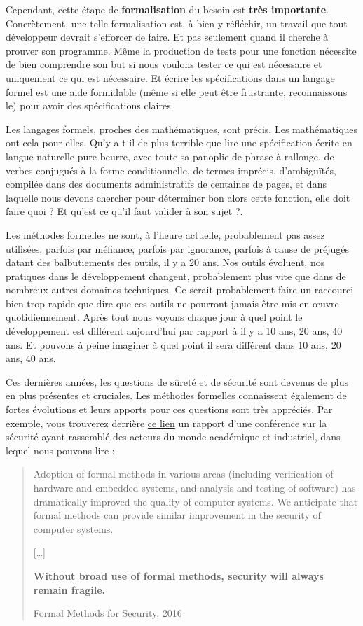 \documentclass[12pt,francais,]{scrbook}
\begin{document}
Cependant, cette étape de \textbf{formalisation} du besoin est
\textbf{très importante}. Concrètement, une telle formalisation est, à
bien y réfléchir, un travail que tout développeur devrait s'efforcer de
faire. Et pas seulement quand il cherche à prouver son programme. Même
la production de tests pour une fonction nécessite de bien comprendre
son but si nous voulons tester ce qui est nécessaire et uniquement ce
qui est nécessaire. Et écrire les spécifications dans un langage formel
est une aide formidable (même si elle peut être frustrante,
reconnaissons le) pour avoir des spécifications claires.

Les langages formels, proches des mathématiques, sont précis. Les
mathématiques ont cela pour elles. Qu'y a-t-il de plus terrible que lire
une spécification écrite en langue naturelle pure beurre, avec toute sa
panoplie de phrase à rallonge, de verbes conjugués à la forme
conditionnelle, de termes imprécis, d'ambiguïtés, compilée dans des
documents administratifs de centaines de pages, et dans laquelle nous
devons chercher pour déterminer \og{}bon alors cette fonction, elle doit
faire quoi ? Et qu'est ce qu'il faut valider à son sujet ?\fg{}.

Les méthodes formelles ne sont, à l'heure actuelle, probablement pas
assez utilisées, parfois par méfiance, parfois par ignorance, parfois à
cause de préjugés datant des balbutiements des outils, il y a 20 ans.
Nos outils évoluent, nos pratiques dans le développement changent,
probablement plus vite que dans de nombreux autres domaines techniques.
Ce serait probablement faire un raccourci bien trop rapide que dire que
ces outils ne pourront jamais être mis en œuvre quotidiennement. Après
tout nous voyons chaque jour à quel point le développement est différent
aujourd'hui par rapport à il y a 10 ans, 20 ans, 40 ans. Et pouvons à
peine imaginer à quel point il sera différent dans 10 ans, 20 ans, 40
ans.

Ces dernières années, les questions de sûreté et de sécurité sont
devenus de plus en plus présentes et cruciales. Les méthodes formelles
connaissent également de fortes évolutions et leurs apports pour ces
questions sont très appréciés. Par exemple, vous trouverez derrière
\href{http://sfm.seas.harvard.edu/report.html}{ce lien} un rapport d'une
conférence sur la sécurité ayant rassemblé des acteurs du monde
académique et industriel, dans lequel nous pouvons lire :

\begin{quote}
Adoption of formal methods in various areas (including verification of
hardware and embedded systems, and analysis and testing of software) has
dramatically improved the quality of computer systems. We anticipate
that formal methods can provide similar improvement in the security of
computer systems.

{[}\ldots{}{]}

\textbf{Without broad use of formal methods, security will always remain
  fragile.}

Formal Methods for Security, 2016
\end{quote}
\end{document}
